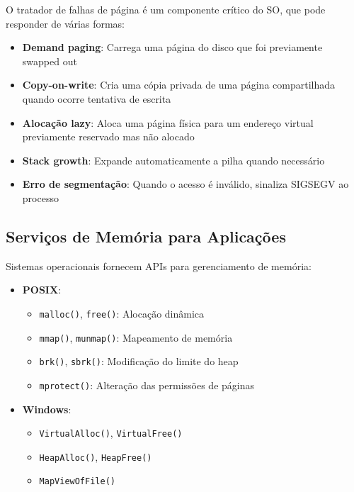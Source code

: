 O tratador de falhas de página é um componente crítico do SO, que pode responder de várias formas:

\begin{itemize}
    \item \textbf{Demand paging}: Carrega uma página do disco que foi previamente swapped out

    \item \textbf{Copy-on-write}: Cria uma cópia privada de uma página compartilhada quando ocorre tentativa de escrita

    \item \textbf{Alocação lazy}: Aloca uma página física para um endereço virtual previamente reservado mas não alocado

    \item \textbf{Stack growth}: Expande automaticamente a pilha quando necessário

    \item \textbf{Erro de segmentação}: Quando o acesso é inválido, sinaliza SIGSEGV ao processo
\end{itemize}

\subsection{Serviços de Memória para Aplicações}
\label{subsec:servicos_memoria}

Sistemas operacionais fornecem APIs para gerenciamento de memória:

\begin{itemize}
    \item \textbf{POSIX}:
    \begin{itemize}
        \item \texttt{malloc()}, \texttt{free()}: Alocação dinâmica
        \item \texttt{mmap()}, \texttt{munmap()}: Mapeamento de memória
        \item \texttt{brk()}, \texttt{sbrk()}: Modificação do limite do heap
        \item \texttt{mprotect()}: Alteração das permissões de páginas
    \end{itemize}

    \item \textbf{Windows}:
    \begin{itemize}
        \item \texttt{VirtualAlloc()}, \texttt{VirtualFree()}
        \item \texttt{HeapAlloc()}, \texttt{HeapFree()}
        \item \texttt{MapViewOfFile()}
    \end{itemize}
\end{itemize}

